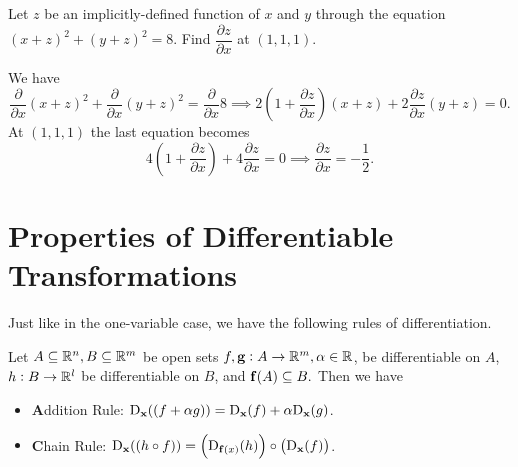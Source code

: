 \begin{multicols}{2}
\begin{problem}
 Let $z$ be an implicitly-defined function of $x$ and $y$ through the equation $(x+z)^2+(y+z)^2=8$. Find
$\dfrac{\partial z}{\partial x}$ at $(1,1,1)$.
\begin{answer}
We have
$$  \dfrac{\partial }{\partial x}(x+z)^2+\dfrac{\partial }{\partial x}(y+z)^2= \dfrac{\partial }{\partial x}8
\implies 2(1+ \dfrac{\partial z}{\partial x})(x+z) +
2\dfrac{\partial z}{\partial x}(y+z)=0.  $$ At $(1,1,1)$ the last
equation becomes
$$ 4(1+ \dfrac{\partial z}{\partial x}) +
4\dfrac{\partial z}{\partial x}=0\implies \dfrac{\partial
z}{\partial x} = -\dfrac{1}{2}.  $$
\end{answer}



\end{problem}



\end{multicols}

\section{Properties of Differentiable Transformations}



Just like in the one-variable case, we have the following rules of
differentiation. 

\begin{thm}
 Let $A \subseteq \mathbb{R}^n, B \subseteq \mathbb{R}^m$ be
open sets $f, \mathbf{ g}:A \rightarrow \mathbb{R}^m, \alpha \in \mathbb{R}$, be
differentiable on $A$, $h:B \rightarrow \mathbb{R}^l$ be differentiable
on $B$, and $\mathbf{ f}(A) \subseteq B.$ Then we have
\begin{itemize}
\item {\textbf Addition Rule:} ${\mathrm{D}}_{{\mathbf x}}((f + \alpha g)) =
{\mathrm{D}}_{{\mathbf x}}(f) + \alpha {\mathrm{D}}_{{\mathbf x}}(g)$. 
\item {\textbf Chain Rule: }
${\mathrm{D}}_{{\mathbf x}}((h \circ f)) = \left({\mathrm{D}}_{{\mathbf {\mathbf{ f}(}x{
)}}}(h)\right)\circ\left({\mathrm{D}}_{{\mathbf x}}(f)\right)$.
\end{itemize}
\end{thm}

